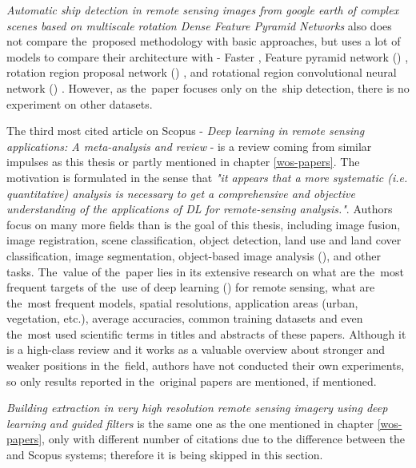 \textit{Automatic ship detection in remote sensing images from google earth of complex scenes based on multiscale rotation Dense Feature Pyramid Networks} also does not compare the~proposed methodology with basic  approaches, but uses a lot of  models to compare their architecture with - Faster , Feature pyramid network () \cite{fpn}, rotation region proposal network () \cite{rrpn}, and rotational region convolutional neural network () \cite{r2cnn}. However, as the~paper focuses only on the~ship detection, there is no experiment on other datasets.

The third most cited article on Scopus - \textit{Deep learning in remote sensing applications: A meta-analysis and review} - is a review coming from similar impulses as this thesis or partly \cite{landslide-evaluation} mentioned in chapter \ref{wos-papers}. The motivation is formulated in the sense that \textit{"it appears that a more systematic (i.e. quantitative) analysis is necessary to get a comprehensive and objective understanding of the applications of DL for remote-sensing analysis."}. Authors focus on many more fields than is the goal of this thesis, including image fusion, image registration, scene classification, object detection, land use and land cover classification, image segmentation, object-based image analysis (), and other tasks. The~value of the~paper lies in its extensive research on what are the~most frequent targets of the~use of deep learning () for remote sensing, what are the~most frequent  models, spatial resolutions, application areas (urban, vegetation, etc.), average accuracies, common training datasets and even the~most used scientific terms in titles and abstracts of these papers. Although it is a high-class review and it works as a valuable overview about  stronger and weaker positions in the~field, authors have not conducted their own experiments, so only results reported in the~original papers are mentioned, if mentioned.

\textit{Building extraction in very high resolution remote sensing imagery using deep learning and guided filters} is the same one as the one mentioned in chapter \ref{wos-papers}, only with different number of citations due to the difference between the  and Scopus systems; therefore it is being skipped in this section.

